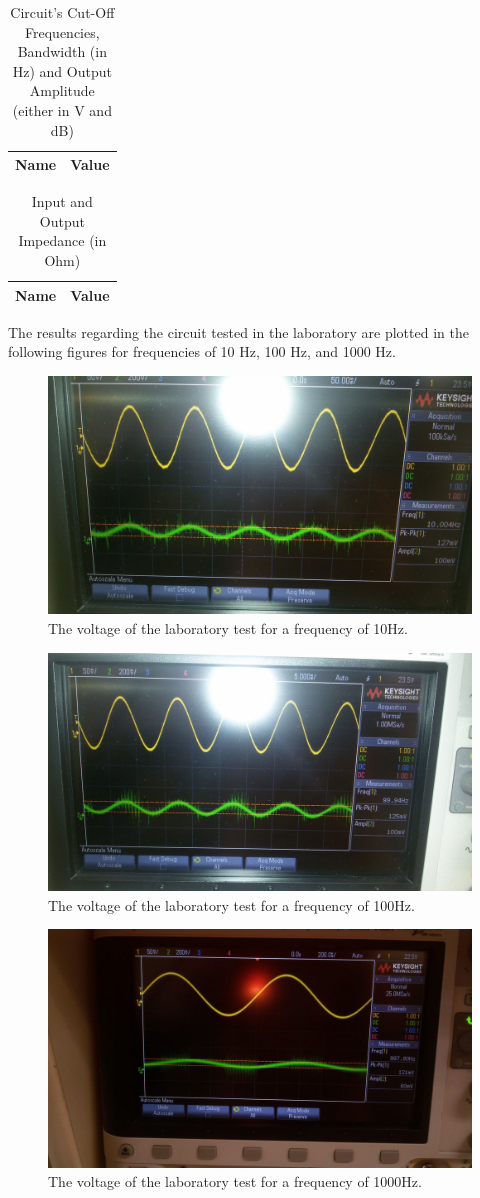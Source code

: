 \begin{table}[H]
\centering
\begin{tabular}{|l|l|}
\hline
{\bf Name} & {\bf Value} \\ \hline
    
\end{tabular}
\caption{Circuit's Cut-Off Frequencies, Bandwidth (in Hz) and Output Amplitude (either in V and dB)}
\end{table}

\begin{table}[H]
\centering
\begin{tabular}{|l|l|}
\hline
{\bf Name} & {\bf Value} \\ \hline
    
    
\end{tabular}
\caption{Input and Output Impedance (in Ohm)}
\end{table}

The results regarding the circuit tested in the laboratory are plotted in the following figures for frequencies of 10 Hz, 100 Hz, and 1000 Hz.

\begin{figure}[h] 
\centering
\includegraphics[width=0.6\linewidth]{10Hz.jpeg}
\caption{The voltage of the laboratory test for a frequency of 10Hz.}
\label{Fig9: 10Hz}
\end{figure}

\begin{figure}[h] 
\centering
\includegraphics[width=0.6\linewidth]{100Hz.jpeg}
\caption{The voltage of the laboratory test for a frequency of 100Hz.}
\label{Fig10: 100Hz}
\end{figure}

\begin{figure}[h] 
\centering
\includegraphics[width=0.6\linewidth]{1000Hz.jpeg}
\caption{The voltage of the laboratory test for a frequency of 1000Hz.}
\label{Fig11: 1000Hz}
\end{figure}
